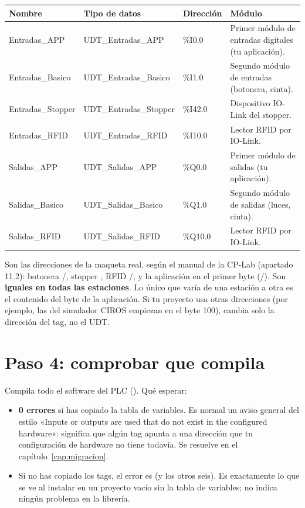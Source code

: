 \begin{center}
\small
\begin{tabularx}{\textwidth}{>{\ttfamily}p{3.6cm}>{\ttfamily}p{4.2cm}>{\ttfamily}p{1.9cm}X}
\toprule
\textnormal{\textbf{Nombre}} & \textnormal{\textbf{Tipo de datos}} & \textnormal{\textbf{Dirección}} & \textbf{Módulo} \\
\midrule
Entradas\_APP & UDT\_Entradas\_APP & \%I0.0 & Primer módulo de entradas digitales (tu aplicación). \\
Entradas\_Basico & UDT\_Entradas\_Basico & \%I1.0 & Segundo módulo de entradas (botonera, cinta). \\
Entradas\_Stopper & UDT\_Entradas\_Stopper & \%I42.0 & Dispositivo IO-Link del stopper. \\
Entradas\_RFID & UDT\_Entradas\_RFID & \%I10.0 & Lector RFID por IO-Link. \\
Salidas\_APP & UDT\_Salidas\_APP & \%Q0.0 & Primer módulo de salidas (tu aplicación). \\
Salidas\_Basico & UDT\_Salidas\_Basico & \%Q1.0 & Segundo módulo de salidas (luces, cinta). \\
Salidas\_RFID & UDT\_Salidas\_RFID & \%Q10.0 & Lector RFID por IO-Link. \\
\bottomrule
\end{tabularx}
\end{center}

\begin{ojo}
Son las direcciones de la maqueta real, según el manual de la CP-Lab (apartado 11.2): botonera /, stopper , RFID /, y la aplicación en el primer byte (/). Son \textbf{iguales en todas las estaciones}. Lo único que varía de una estación a otra es el contenido del byte de la aplicación. Si tu proyecto usa otras direcciones (por ejemplo, las del simulador CIROS empiezan en el byte 100), cambia solo la dirección del tag, no el UDT.
\end{ojo}

\section{Paso 4: comprobar que compila}
Compila todo el software del PLC (). Qué esperar:

\begin{itemize}
\item \textbf{0 errores} si has copiado la tabla de variables. Es normal un aviso general del estilo «Inputs or outputs are used that do not exist in the configured hardware»: significa que algún tag apunta a una dirección que tu configuración de hardware no tiene todavía. Se resuelve en el capítulo~\ref{cap:migracion}.
\item Si no has copiado los tags, el error es  (y los otros seis). Es exactamente lo que se ve al instalar en un proyecto vacío sin la tabla de variables; no indica ningún problema en la librería.
\end{itemize}

